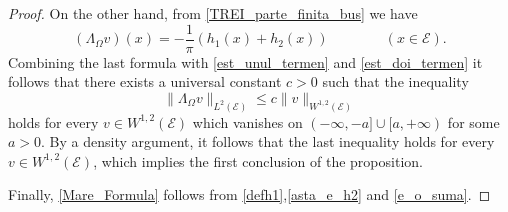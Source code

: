 \documentclass[10pt,a4paper]{amsart}
\begin{document}
\begin{proof}
On the other hand, from \eqref{TREI_parte_finita_bus} we have
\begin{equation}\label{e_o_suma}
\left(\Lambda_\Omega v\right)(x)=-\frac{1}{\pi}(h_1(x) + h_2(x)) \qquad\qquad(x\in \mathcal{E}).
\end{equation}
Combining the last formula with \eqref{est_unul_termen} and \eqref{est_doi_termen} it follows that there exists a universal
constant $c>0$ such that the inequality
$$
\|\Lambda_\Omega v\|_{L^2(\mathcal{E})} \leqslant c\|v\|_{W^{1,2}(\mathcal{E})}
$$
holds for every $v\in W^{1,2}(\mathcal{E})$ which vanishes on $(-\infty,-a]\cup [a,+\infty)$ for some $a>0$.
By a density argument, it follows that the last inequality holds for every $v\in W^{1,2}(\mathcal{E})$, which implies the first conclusion of the proposition.

Finally, \eqref{Mare_Formula} follows from \eqref{defh1},\eqref{asta_e_h2} and \eqref{e_o_suma}.
\end{proof}
\end{document}
